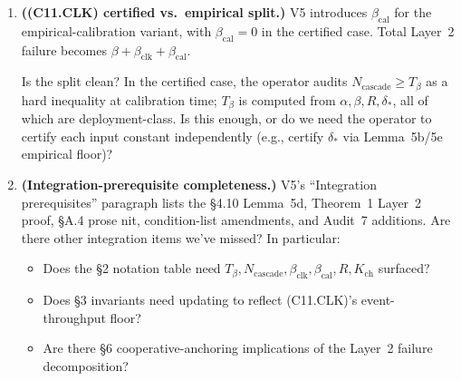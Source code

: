 \documentclass{article}
\newcommand{\deltastar}{\delta_{*}}
\newcommand{\Tbeta}{T_{\beta}}
\newcommand{\Ncasc}{N_{\mathrm{cascade}}}
\newcommand{\bclk}{\beta_{\mathrm{clk}}}
\newcommand{\bcal}{\beta_{\mathrm{cal}}}
\begin{document}
\begin{enumerate}
\item \textbf{((C11.CLK) certified vs.\ empirical split.)}  V5
  introduces $\bcal$ for the empirical-calibration variant, with
  $\bcal = 0$ in the certified case.  Total Layer~2 failure
  becomes $\beta + \bclk + \bcal$.

  Is the split clean?  In the certified case, the operator audits
  $\Ncasc \geq \Tbeta$ as a hard inequality at calibration time;
  $\Tbeta$ is computed from $\alpha, \beta, R, \deltastar$, all of
  which are deployment-class.  Is this enough, or do we need the
  operator to certify each input constant independently (e.g.,
  certify $\deltastar$ via Lemma~5b/5e empirical floor)?

\item \textbf{(Integration-prerequisite completeness.)}  V5's
  ``Integration prerequisites'' paragraph lists the §4.10
  Lemma~5d, Theorem~1 Layer~2 proof, §A.4 prose nit, condition-list
  amendments, and Audit~7 additions.  Are there other integration
  items we've missed?  In particular:
  \begin{itemize}
  \item Does the §2 notation table need $\Tbeta, \Ncasc, \bclk,
    \bcal, R, K_{\mathrm{ch}}$ surfaced?
  \item Does §3 invariants need updating to reflect (C11.CLK)'s
    event-throughput floor?
  \item Are there §6 cooperative-anchoring implications of the
    Layer~2 failure decomposition?
  \end{itemize}
\end{enumerate}
\end{document}

